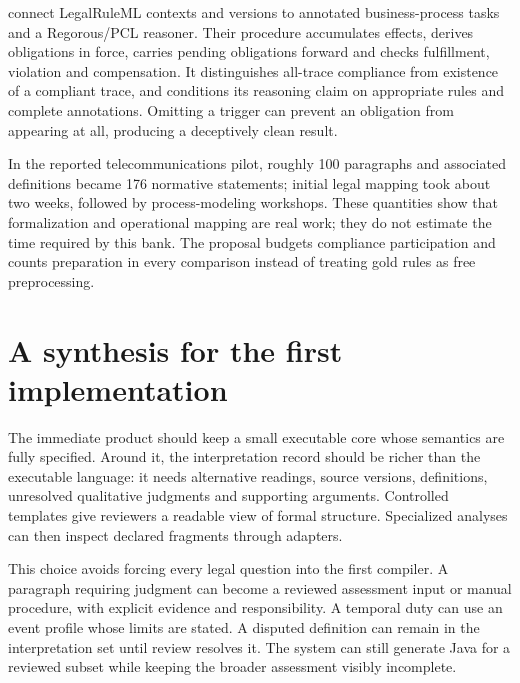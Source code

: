 \citet[secs.~3--4]{semanticcompliance2016} connect LegalRuleML contexts and
versions to annotated business-process tasks and a Regorous/PCL reasoner. Their
procedure accumulates effects, derives obligations in force, carries pending
obligations forward and checks fulfillment, violation and compensation. It
distinguishes all-trace compliance from existence of a compliant trace, and
conditions its reasoning claim on appropriate rules and complete annotations.
Omitting a trigger can prevent an obligation from appearing at all, producing a
deceptively clean result.

In the reported telecommunications pilot, roughly 100 paragraphs and associated
definitions became 176 normative statements; initial legal mapping took about
two weeks, followed by process-modeling workshops. These quantities show that
formalization and operational mapping are real work; they do not estimate the
time required by this bank. The proposal budgets compliance participation and
counts preparation in every comparison instead of treating gold rules as free
preprocessing.



\section{A synthesis for the first implementation}
\label{merge:M04:14}

\label{sec:languages-synthesis}
The immediate product should keep a small executable core whose semantics are
fully specified. Around it, the interpretation record should be richer than
the executable language: it needs alternative readings, source versions,
definitions, unresolved qualitative judgments and supporting arguments.
Controlled templates give reviewers a readable view of formal structure.
Specialized analyses can then inspect declared fragments through adapters.

This choice avoids forcing every legal question into the first compiler.
A paragraph requiring judgment can become a reviewed assessment input or
manual procedure, with explicit evidence and responsibility. A temporal duty
can use an event profile whose limits are stated. A disputed definition can
remain in the interpretation set until review resolves it. The system can
still generate Java for a reviewed subset while keeping the broader
assessment visibly incomplete.

